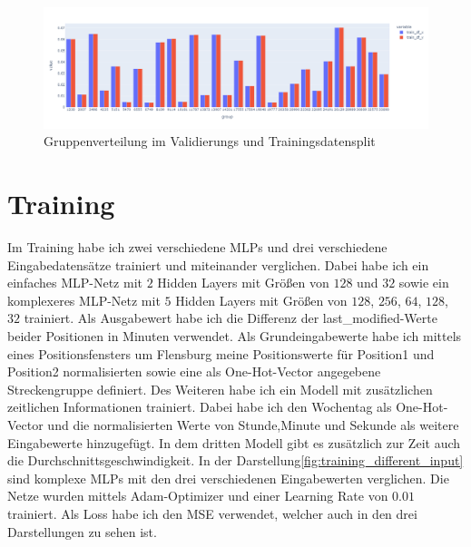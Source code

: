 \documentclass[a4paper]{article}
\begin{document}
    \begin{figure}[h]
        \includegraphics[scale=0.35]{figures/fig5_gruppen_verteilung}
        \centering
        \caption{Gruppenverteilung im Validierungs und Trainingsdatensplit}
        \label{fig:gruppen_verteilung}
    \end{figure}


    \section{Training}
    \label{sec:training}

    Im Training habe ich zwei verschiedene MLPs und drei verschiedene Eingabedatensätze trainiert und miteinander
    verglichen. Dabei habe ich ein einfaches MLP-Netz mit $2$ Hidden Layers mit Größen von $128$ und $32$ sowie ein
    komplexeres MLP-Netz mit $5$ Hidden Layers mit Größen von $128$, $256$, $64$, $128$, $32$ trainiert. Als Ausgabewert
    habe ich die Differenz der last\_modified-Werte beider Positionen in Minuten verwendet. Als Grundeingabewerte habe
    ich mittels eines Positionsfensters um Flensburg meine Positionswerte für Position1 und Position2 normalisierten
    sowie eine als One-Hot-Vector angegebene Streckengruppe definiert. Des Weiteren habe ich ein Modell mit zusätzlichen
    zeitlichen Informationen trainiert. Dabei habe ich den Wochentag als One-Hot-Vector und die normalisierten Werte von
    Stunde,Minute und Sekunde als weitere Eingabewerte hinzugefügt. In dem dritten Modell gibt es zusätzlich zur Zeit
    auch die Durchschnittsgeschwindigkeit. In der Darstellung\ref{fig:training_different_input} sind komplexe MLPs mit
    den drei verschiedenen Eingabewerten verglichen. Die Netze wurden mittels Adam\cite{adamoptimizer}-Optimizer und
    einer Learning Rate von $0.01$ trainiert. Als Loss habe ich den MSE verwendet, welcher auch in den drei Darstellungen
    zu sehen ist.
\end{document}
